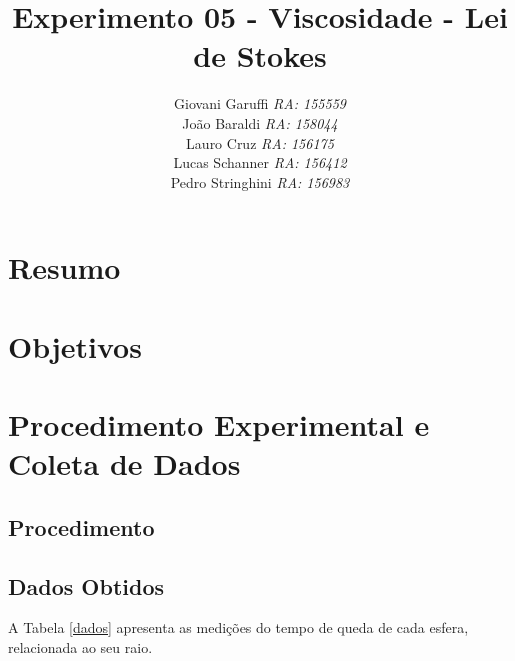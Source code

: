 \documentclass[12pt,a4paper]{article}
\begin{document}
\title{\vspace{70mm}\Huge Experimento 05 - Viscosidade - Lei de Stokes}
\author{ Giovani Garuffi\qquad\hfill
		\textit {RA: 155559}\protect\\
		João Baraldi\hfill
		\textit{RA: 158044}\protect\\
		Lauro Cruz\hfill
		\textit{RA: 156175}\protect\\
		Lucas Schanner\hfill
		\textit{RA: 156412}\protect\\
		Pedro Stringhini\hfill
		\textit {RA: 156983}								
		}
\maketitle
\newpage
\section{Resumo}


\section{Objetivos}



\section{Procedimento Experimental e Coleta de Dados}


\subsection{Procedimento}

\subsection{Dados Obtidos}

A Tabela \ref{dados} apresenta as medições do tempo de queda de cada esfera, relacionada ao seu raio.
\end{document}
